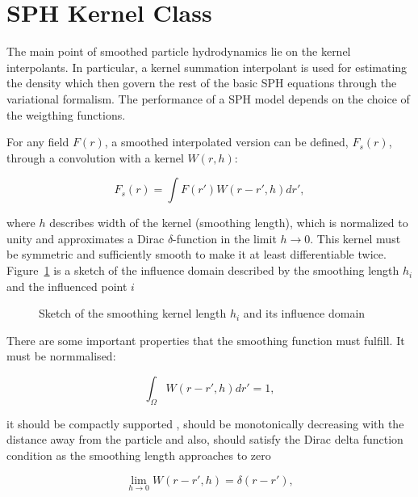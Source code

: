 \section{SPH Kernel Class}
\label{sec:section 5}

The main point of smoothed particle hydrodynamics lie on the kernel interpolants. In particular, a kernel summation interpolant is used for estimating the density
which then govern the rest of the basic SPH equations through the variational formalism. The performance of a SPH model depends on the choice of the weigthing functions. \par
For any field $F(r)$, a smoothed interpolated version can be defined, $F_{s}(r)$, through a convolution with a kernel $W(r,h)$:

\begin{equation}
 F_{s}(r) = \int F(r') W(r-r',h)dr' ,
\end{equation}

where $h$ describes width of the kernel (smoothing length), which is normalized to unity and approximates a Dirac $\delta$-function in the limit $h\rightarrow 0$. This kernel must be symmetric
and sufficiently smooth to make it at least differentiable twice. Figure~\ref{fig:Bild3.9} is a sketch of the influence domain described by the smoothing length $h_{i}$ and the influenced
point $i$


\begin{figure}[H]
\centering
  \begin{footnotesize}
  
  \caption[Sketch of the smoothing kernel length $h_{i}$ and its influence domainSketch of the smoothing kernel length $h_{i}$ and its influence domain]{Sketch of the smoothing kernel length $h_{i}$ and its influence domain}
  \label{fig:Bild3.9}
  \end{footnotesize}
\end{figure} 

There are some important properties that the smoothing function must fulfill. It must be normmalised:

\begin{equation}
 \int_{\Omega}W(r-r',h)dr'= 1 ,
\end{equation}

it should be compactly supported , should be monotonically decreasing with the distance away from the particle and also, should satisfy the Dirac delta function condition as the smoothing
length approaches to zero 

\begin{equation}
 \lim_{h\to 0} W(r-r',h)= \delta(r-r') ,
\end{equation}

